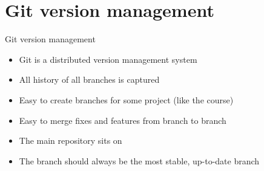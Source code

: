 
\author{Thijs Heus}
% 

\section[Git]{Git version management}
\begin{frame}{Git version management}
 \begin{itemize}
  \item Git is a distributed version management system
  \item All history of all branches is captured
  \item Easy to create branches for some project (like the course)
  \item Easy to merge fixes and features from branch to branch
  \item The main repository sits on 
  \item The  branch should always be the most stable, up-to-date branch
 \end{itemize}

\end{frame}

